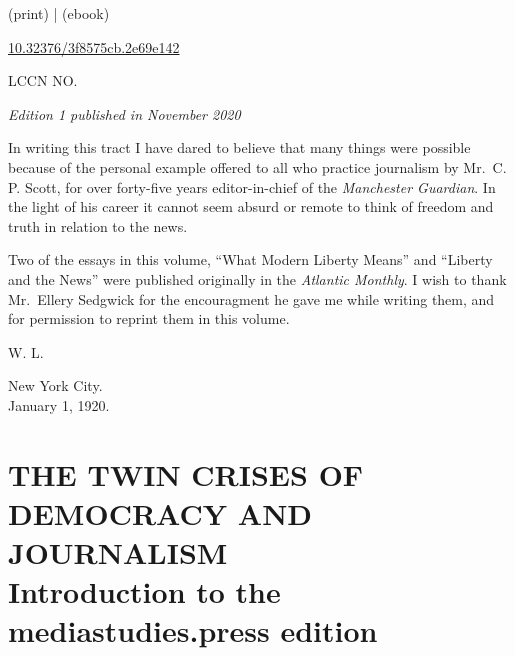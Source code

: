\documentclass[openany,nobib,twoside,nohyper]{tufte-book}
\let\oldchapter\chapter
\def\chapter{%
  \setcounter{footnote}{0}%
  \oldchapter
}
\begin{document}
\begin{fullwidth}
\par {} (print) |  (ebook)

\par {} \href{https://doi.org/10.32376/3f8575cb.2e69e142}{10.32376/3f8575cb.2e69e142}

\par {} LCCN NO.

\par\textit{Edition 1 published in November 2020}






\newpage
\thispagestyle{empty}
\begingroup
\vspace*{.15in}

\setlength{\parindent}{5ex}
\huge{In writing this tract I have dared to believe that many things were
possible because of the personal example offered to all who practice
journalism by Mr.~C. P. Scott, for over forty-five years editor-in-chief
of the \emph{Manchester Guardian}. In the light of his career it cannot
seem absurd or remote to think of freedom and truth in relation to the
news.}

\huge{Two of the essays in this volume, ``What Modern Liberty Means'' and
``Liberty and the News'' were published originally in the \emph{Atlantic
Monthly}. I wish to thank Mr.~Ellery Sedgwick for the encouragment he
gave me while writing them, and for permission to reprint them in this
volume.}

\begin{flushright}W. L.\end{flushright}

\vspace*{2mm}

\noindent New York City.\\
January 1, 1920.

\endgroup
\begingroup


\LARGE

\tableofcontents

\endgroup

\end{fullwidth}

\chapter[THE TWIN CRISES OF DEMOCRACY AND JOURNALISM]{THE TWIN CRISES OF DEMOCRACY AND\\ JOURNALISM\\ Introduction to the mediastudies.press edition}
\label{ch:introduction-msp}
\end{document}
